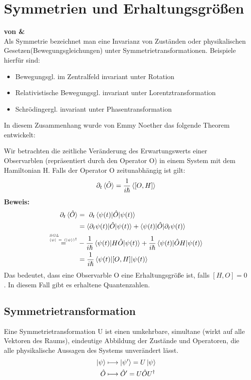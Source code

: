 \documentclass[Ex4_Zusammenfassung.tex]{subfiles}
\begin{document}
\chapter{Symmetrien und Erhaltungsgrößen}
\textbf{von \mitsch \& \soeren} \\ 

Als Symmetrie bezeichnet man eine Invarianz von Zuständen oder physikalischen Gesetzen(Bewegungsgleichungen) unter Symmetrietransformationen.
Beispiele hierfür sind:
\begin{itemize}
\item Bewegungsgl. im Zentralfeld invariant unter Rotation
\item Relativistische Bewegungsgl. invariant unter Lorentztransformation
\item Schrödingergl. invariant unter Phasentransformation
\end{itemize}
In diesem Zusammenhang wurde von Emmy Noether das folgende Theorem entwickelt:

Wir betrachten die zeitliche Veränderung des Erwartungswerts einer Observarblen (repräsentiert durch den Operator O) in einem System mit dem Hamiltonian H. Falls der Operator O zeitunabhängig ist gilt:
\begin{equation}
\partial_t \braket{\hat{O}} = \frac{1}{i\hslash} \braket{[O,H]}
\end{equation}
\textbf{Beweis:}
	\begin{align*}
	\partial_t \braket{\hat{O}} &= \ \partial_t \braket{\psi(t)|\hat{O}|\psi(t)} \\ 
	&=\braket{\partial_t \psi(t)|\hat{O}|\psi(t)} + \braket{\psi(t)|\hat{O}|\partial_t \psi(t)} \\ \stackrel{^{SGL}_{\bra{\psi} \  = \ (\ket{\psi})^{\dag}}}{=} &-\frac{1}{i\hslash} \braket{\psi(t)|H\hat{O}|\psi(t)} + \frac{1}{i\hslash} \braket{\psi(t)|\hat{O} H |\psi(t)} \\ 
	&= \frac{1}{i\hslash} \braket{\psi(t)|[O,H]|\psi(t)}
	\end{align*}
Das bedeutet, dass eine Observarble O eine Erhaltungsgröße ist, falls $[H,O] = 0$.  In diesem Fall gibt es erhaltene Quantenzahlen. 
\section{Symmetrietransformation}
Eine Symmetrietransformation U ist einen umkehrbare, simultane (wirkt auf alle Vektoren des Raums), eindeutige Abbildung der Zustände und Operatoren, die alle physikalische Aussagen des Systems unverändert lässt.
\begin{align}
\ket{\psi} &\longmapsto \ket{\psi'} = U \ket{\psi} \\
\hat{O} &\longmapsto \hat{O}' = U \hat{O} U^{\dag}
\end{align}
\end{document}
